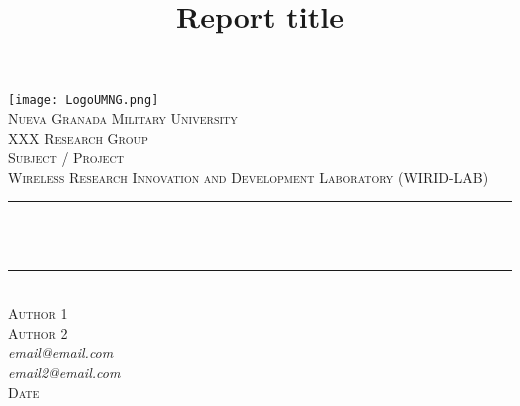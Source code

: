 \documentclass[12pt]{article}
\title{Report  title  }
\makeatletter
\let\thetitle\@title
\let\theauthor\@author
\makeatother
\begin{document}
	
	
	\begin{titlepage}
		\centering
		\vspace*{0.5 cm}
		\texttt{[image: LogoUMNG.png]}\\[1.0 cm]	%
		
		\textsc{\LARGE  Nueva Granada Military University  }\\[0.5 cm]	%
		
		\textsc{\large  XXX Research Group  }\\[1 cm]	%
		
		
		\textsc{\large Subject / Project  }\\[1 cm]				%
		
		
		
		\textsc{\large  Wireless Research Innovation and Development Laboratory (WIRID-LAB)  }\\[0.5 cm] 
		
		\rule{\linewidth}{0.2 mm} \\[0.4 cm]
		{ \huge \bfseries \thetitle}\\
		\rule{\linewidth}{0.2 mm} \\[1.5 cm]
		
	    \textsc{\large Author 1 \\
	    Author 2 }\\[1cm]
		
		\large{\textit{email@email.com \\ email2@email.com}}\\[1cm]
			
		\textsc{\large Date }\\[1.5 cm]
		
		\begin{minipage}{0.7\textwidth}
			\begin{flushleft} \large
				
			\end{flushleft}
		\end{minipage}~
		

\end{titlepage}
\end{document}
